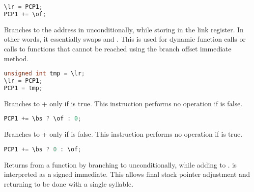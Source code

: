 \begin{lstlisting}[numbers=none, basicstyle=\ttfamily\footnotesize, language=C++]
\lr = PCP1;
PCP1 += \of;
\end{lstlisting}

Branches to the address in \code{\lr} unconditionally, while storing  
in the link register. In other words, it essentially swaps  and 
\code{\lr}. This is used for dynamic function calls or calls to functions that 
cannot be reached using the branch offset immediate method.

\begin{lstlisting}[numbers=none, basicstyle=\ttfamily\footnotesize, language=C++]
unsigned int tmp = \lr;
\lr = PCP1;
PCP1 = tmp;
\end{lstlisting}

Branches to  + \code{\of} only if \code{\bs} is true. This 
instruction performs no operation if \code{\bs} is false.

\begin{lstlisting}[numbers=none, basicstyle=\ttfamily\footnotesize, language=C++]
PCP1 += \bs ? \of : 0;
\end{lstlisting}

Branches to  + \code{\of} only if \code{\bs} is false. This 
instruction performs no operation if \code{\bs} is true.

\begin{lstlisting}[numbers=none, basicstyle=\ttfamily\footnotesize, language=C++]
PCP1 += \bs ? 0 : \of;
\end{lstlisting}

Returns from a function by branching to \code{\lr} unconditionally, while adding 
\code{\sa} to \code{\rs}. \code{\sa} is interpreted as a signed immediate. This
allows final stack pointer adjustment and returning to be done with a single
syllable.


